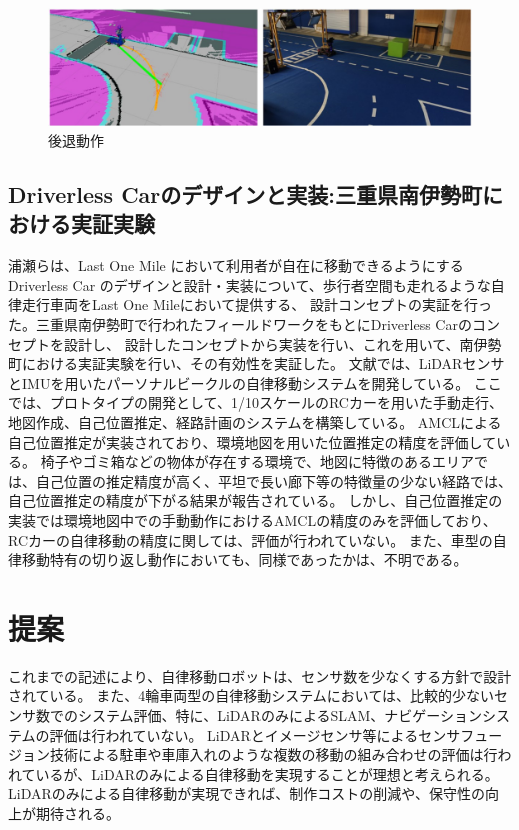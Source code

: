 \begin{figure}[h]
  \begin{center}
  \includegraphics[width=.8\linewidth]{img/auto_1.jpg}
  \caption{後退動作}
  \label{auto:comp:koutai}
  \end{center}
\end{figure}

\subsection{Driverless Carのデザインと実装:三重県南伊勢町における実証実験}
浦瀬ら\cite{auto:design}は、Last One Mile において利用者が自在に移動できるようにする
Driverless Car のデザインと設計・実装について、歩行者空間も走れるような自律走行車両をLast One Mileにおいて提供する、
設計コンセプトの実証を行った。三重県南伊勢町で行われたフィールドワークをもとにDriverless Carのコンセプトを設計し、
設計したコンセプトから実装を行い、これを用いて、南伊勢町における実証実験を行い、その有効性を実証した。
文献では、LiDARセンサとIMUを用いたパーソナルビークルの自律移動システムを開発している。
ここでは、プロトタイプの開発として、1/10スケールのRCカーを用いた手動走行、地図作成、自己位置推定、経路計画のシステムを構築している。
AMCLによる自己位置推定が実装されており、環境地図を用いた位置推定の精度を評価している。
椅子やゴミ箱などの物体が存在する環境で、地図に特徴のあるエリアでは、自己位置の推定精度が高く、平坦で長い廊下等の特徴量の少ない経路では、自己位置推定の精度が下がる結果が報告されている。
しかし、自己位置推定の実装では環境地図中での手動動作におけるAMCLの精度のみを評価しており、RCカーの自律移動の精度に関しては、評価が行われていない。
また、車型の自律移動特有の切り返し動作においても、同様であったかは、不明である。

\section{提案}
これまでの記述により、自律移動ロボットは、センサ数を少なくする方針で設計されている。
また、4輪車両型の自律移動システムにおいては、比較的少ないセンサ数でのシステム評価、特に、LiDARのみによるSLAM、ナビゲーションシステムの評価は行われていない。
LiDARとイメージセンサ等によるセンサフュージョン技術による駐車や車庫入れのような複数の移動の組み合わせの評価は行われているが、LiDARのみによる自律移動を実現することが理想と考えられる。
LiDARのみによる自律移動が実現できれば、制作コストの削減や、保守性の向上が期待される。

